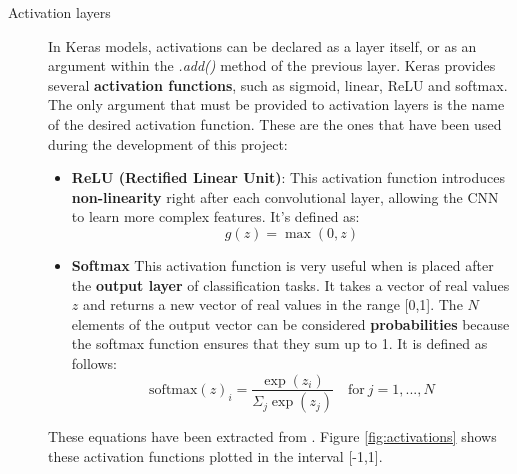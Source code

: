 \begin{description}
	\item[Activation layers] In Keras models, activations can be declared as a layer itself, or as an argument within the \textit{.add()} method of the previous layer. Keras provides several \textbf{activation functions}, such as sigmoid, linear, ReLU and softmax. The only argument that must be provided to activation layers is the name of the desired activation function. These are the ones that have been used during the development of this project:
	\begin{itemize}
		\item \textbf{ReLU (Rectified Linear Unit)}: This activation function introduces \textbf{non-linearity} right after each convolutional layer, allowing the CNN to learn more complex features. It's defined as:
		\begin{equation}\label{eq:ReLU}
		g(z)=\max(0,z)
		\end{equation}
		
		\item \textbf{Softmax} This activation function is very useful when is placed after the \textbf{output layer} of classification tasks. It takes a vector of real values $z$ and returns a new vector of real values in the range [0,1]. The $N$ elements of the output vector can be considered \textbf{probabilities} because the softmax function ensures that they sum up to 1. It is defined as follows:
		\begin{equation}\label{eq:SoftMax}
		\mathrm{softmax}(z)_i=\frac{\exp(z_i)}{\Sigma_{j}{\exp(z_j)}} \quad \mathrm{for} \ j=1, ...,N
		\end{equation}
	\end{itemize}
	These equations have been extracted from \cite{Goodfellow-et-al-2016}. Figure \ref{fig:activations} shows these activation functions plotted in the interval [-1,1].


\end{description}
